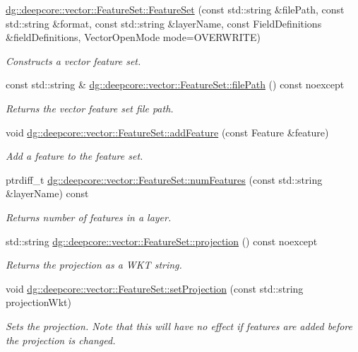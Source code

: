 \begin{DoxyCompactItemize}
\hyperlink{group___vector_module_ga22680002b22c9e68d0fbaeada82d6e23}{dg\+::deepcore\+::vector\+::\+Feature\+Set\+::\+Feature\+Set} (const std\+::string \&file\+Path, const std\+::string \&format, const std\+::string \&layer\+Name, const Field\+Definitions \&field\+Definitions, Vector\+Open\+Mode mode=O\+V\+E\+R\+W\+R\+I\+TE)
\begin{DoxyCompactList}\small\item\em Constructs a vector feature set. \end{DoxyCompactList}\item 
const std\+::string \& \hyperlink{group___vector_module_ga438beae23c8c7333e1763addeb99b286}{dg\+::deepcore\+::vector\+::\+Feature\+Set\+::file\+Path} () const noexcept
\begin{DoxyCompactList}\small\item\em Returns the vector feature set file path. \end{DoxyCompactList}\item 
void \hyperlink{group___vector_module_ga9117c49056efd1ac51c2bb74043b50d6}{dg\+::deepcore\+::vector\+::\+Feature\+Set\+::add\+Feature} (const Feature \&feature)
\begin{DoxyCompactList}\small\item\em Add a feature to the feature set. \end{DoxyCompactList}\item 
ptrdiff\+\_\+t \hyperlink{group___vector_module_ga6ea15b282c93cedd1ddc676f1146e967}{dg\+::deepcore\+::vector\+::\+Feature\+Set\+::num\+Features} (const std\+::string \&layer\+Name) const 
\begin{DoxyCompactList}\small\item\em Returns number of features in a layer. \end{DoxyCompactList}\item 
std\+::string \hyperlink{group___vector_module_ga6067c0ad1fc35879804d30756d6af8d8}{dg\+::deepcore\+::vector\+::\+Feature\+Set\+::projection} () const noexcept
\begin{DoxyCompactList}\small\item\em Returns the projection as a W\+KT string. \end{DoxyCompactList}\item 
void \hyperlink{group___vector_module_gab665679d2cea8d9b0c324fd52410e181}{dg\+::deepcore\+::vector\+::\+Feature\+Set\+::set\+Projection} (const std\+::string projection\+Wkt)
\begin{DoxyCompactList}\small\item\em Sets the projection. Note that this will have no effect if features are added before the projection is changed. \end{DoxyCompactList}\item 

\end{DoxyCompactItemize}
